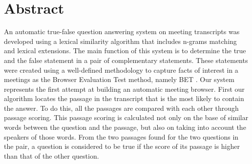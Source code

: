 


\newpage

\section*{Abstract}
\small
\onehalfspacing


An automatic true-false question answering system on meeting transcripts was developed using a lexical similarity algorithm that includes n-grams matching and lexical extensions. The main function of this system is to determine the true and the false statement in a pair of complementary statements. These statements were created using a well-defined methodology to capture facts of interest in a meetings as the Browser Evaluation Test method, namely BET \cite{BET}. Our system represents the first attempt at building an automatic meeting browser. First our algorithm locates the passage in the transcript that is the most likely to contain the answer. To do this, all the passages are compared with each other through passage scoring. This passage scoring is calculated not only on the base of similar words between the question and the passage, but also on taking into account the speakers of those words. From the two passages found for the two questions in the pair, a question is considered to be true if the score of its passage is higher than that of the other question.

